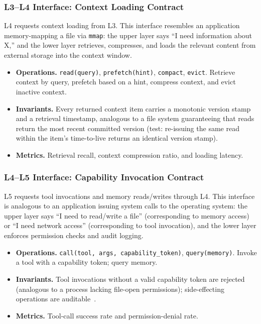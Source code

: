 \subsubsection{L3--L4 Interface: Context Loading Contract}

L4 requests context loading from L3. This interface resembles an application memory-mapping a file via \texttt{mmap}: the upper layer says ``I need information about X,'' and the lower layer retrieves, compresses, and loads the relevant content from external storage into the context window.

\begin{itemize}[nosep]
\item \textbf{Operations.}
\texttt{read(query)}, \texttt{prefetch(hint)}, \texttt{compact}, \texttt{evict}.
Retrieve context by query, prefetch based on a hint, compress context, and evict inactive context.
\item \textbf{Invariants.}
Every returned context item carries a monotonic version stamp and a retrieval timestamp, analogous to a file system guaranteeing that reads return the most recent committed version (test: re-issuing the same read within the item's time-to-live returns an identical version stamp).
\item \textbf{Metrics.}
Retrieval recall, context compression ratio, and loading latency.
\end{itemize}

\subsubsection{L4--L5 Interface: Capability Invocation Contract}

L5 requests tool invocations and memory reads/writes through L4. This interface is analogous to an application issuing system calls to the operating system: the upper layer says ``I need to read/write a file'' (corresponding to memory access) or ``I need network access'' (corresponding to tool invocation), and the lower layer enforces permission checks and audit logging.

\begin{itemize}[nosep]
\item \textbf{Operations.}
\texttt{call(tool, args, capability\_token)}, \texttt{query(memory)}.
Invoke a tool with a capability token; query memory.
\item \textbf{Invariants.}
Tool invocations without a valid capability token are rejected (analogous to a process lacking file-open permissions); side-effecting operations are auditable~\cite{debenedetti2025camel}.
\item \textbf{Metrics.}
Tool-call success rate and permission-denial rate.
\end{itemize}


